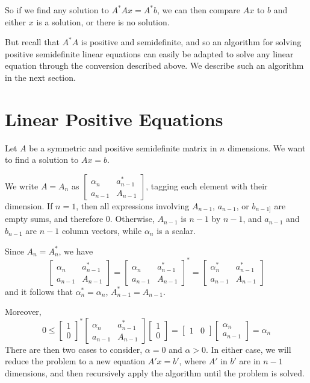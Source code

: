 \documentclass{article}
\begin{document}
So if we find any solution to $A^*Ax = A^*b$, we can then compare $Ax$ to $b$
and either $x$ is a solution, or there is no solution.

But recall that $A^*A$ is positive and semidefinite, and so an algorithm for
solving positive semidefinite linear equations can easily be adapted to solve
any linear equation through the conversion described above. We describe such an
algorithm in the next section.

\section{Linear Positive Equations}

Let $A$ be a symmetric and positive semidefinite matrix in $n$ dimensions. We want to find a solution to
$Ax = b$.

We write $A = A_n$ as $\begin{bmatrix}\alpha_n & a^*_{n - 1} \\ a_{n - 1} & A_{n
    - 1}\end{bmatrix}$, tagging each element with their dimension.
If $n = 1$, then all expressions involving $A_{n-1}$, $a_{n - 1}$, or $b_{n - 1]}$ are
empty sums, and therefore 0. Otherwise, $A_{n - 1}$ is $n-1$ by $n-1$, and $a_{n
- 1}$ and $b_{n - 1}$ are $n-1$ column vectors, while $\alpha_n$ is a scalar.

Since $A_n=A^*_n$, we have
$$ \begin{bmatrix}\alpha_n & a^*_{n-1} \\ a_{n - 1} & A_{n - 1}\end{bmatrix} = 
   \begin{bmatrix}\alpha_n & a_{n-1}^* \\ a_{n-1} & A_{n-1}\end{bmatrix}^* = 
   \begin{bmatrix}\alpha_n^* & a_{n-1}^* \\ a_{n-1} & A_{n-1}\end{bmatrix} $$
and it follows that $\alpha_n^*=\alpha_n$, $A_{n-1}^{*} = A_{n-1}$.

Moreover, 
$$
0 \leq \begin{bmatrix}1\\0\end{bmatrix}^*\begin{bmatrix}\alpha_n & a_{n-1}^* \\ a_{n-1} & A_{n-1}\end{bmatrix}\begin{bmatrix}1\\0\end{bmatrix}
= \begin{bmatrix}1&0\end{bmatrix}\begin{bmatrix}\alpha_n \\ a_{n-1}\end{bmatrix}
= \alpha_n
$$
There are then two cases to consider, $\alpha = 0$ and $\alpha > 0$. In either
case, we will reduce the problem to a new equation $A'x = b'$, where $A'$ in
$b'$ are in $n - 1$ dimensions, and then recursively apply the algorithm until
the problem is solved.
\end{document}
